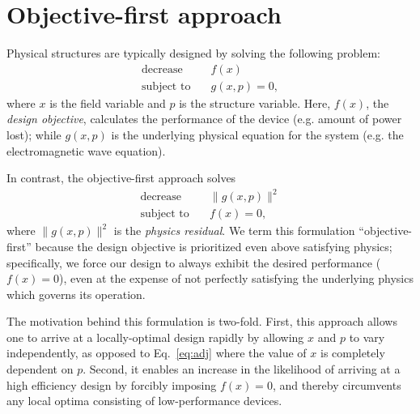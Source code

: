 \section{Objective-first approach}
Physical structures are typically designed by solving the following problem:
    \begin{subequations}\label{eq:adj}
    \begin{align} 
    \text{decrease} & \quad f(x) \label{eq:adj:obj} \\ 
    \text{subject to} & \quad g(x,p) = 0, \label{eq:adj:con}
    \end{align}
    \end{subequations}
    where $x$ is the field variable and $p$ is the structure variable.
Here, $f(x)$, the \emph{design objective}, 
    calculates the performance of the device 
    (e.g. amount of power lost); 
    while $g(x,p)$ is the underlying physical equation for the system
    (e.g. the electromagnetic wave equation).

In contrast, the objective-first approach solves 
    \begin{subequations}\label{eq:ob1}
    \begin{align} 
    \text{decrease} & \quad \|g(x,p)\|^2 \label{eq:ob1:obj} \\ 
    \text{subject to} & \quad f(x) = 0, \label{eq:ob1:con}
    \end{align}
    \end{subequations}
    where $\|g(x,p)\|^2$ is the \emph{physics residual}.
We term this formulation ``objective-first''
    because the design objective is prioritized even above satisfying physics;
    specifically, we force our design to always exhibit the desired performance
    ($f(x) = 0$), even at the expense of
    not perfectly satisfying the underlying physics which governs its operation.

The motivation behind this formulation is two-fold.
First, this approach allows one to arrive at a locally-optimal design rapidly 
    by allowing $x$ and $p$ to vary independently, 
    as opposed to Eq.~\ref{eq:adj}
    where the value of $x$ is completely dependent on $p$.
Second, it enables an increase in the likelihood of 
    arriving at a high efficiency design
    by forcibly imposing $f(x) = 0$,
    and thereby circumvents any local optima consisting of
    low-performance devices.

